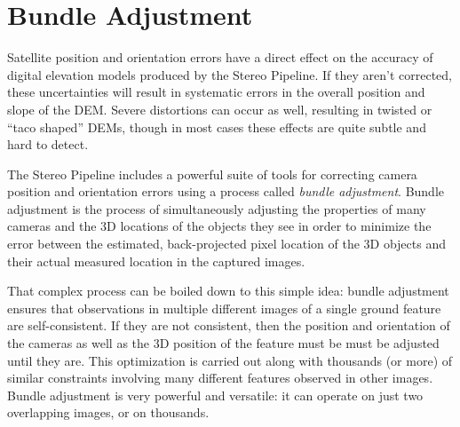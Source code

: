 \chapter{Bundle Adjustment}
\label{ch:bundle_adjustment}

Satellite position and orientation errors have a direct effect on the
accuracy of digital elevation models produced by the Stereo Pipeline.
If they aren't corrected, these uncertainties will result in
systematic errors in the overall position and slope of the DEM.  Severe
distortions can occur as well, resulting in twisted or ``taco shaped''
DEMs, though in most cases these effects are quite subtle and hard to
detect.

The Stereo Pipeline includes a powerful suite of tools for correcting
camera position and orientation errors using a process called
\emph{bundle adjustment}.  Bundle adjustment is the process of
simultaneously adjusting the properties of many cameras and the 3D
locations of the objects they see in order to minimize the error
between the estimated, back-projected pixel location of the 3D
objects and their actual measured location in the captured images.

That complex process can be boiled down to this simple idea: bundle
adjustment ensures that observations in multiple different images
of a single ground feature are self-consistent.  If they are not
consistent, then the position and orientation of the cameras as
well as the 3D position of the feature must be must be adjusted
until they are.  This optimization is carried out along with thousands
(or more) of similar constraints involving many different features
observed in other images.  Bundle adjustment is very powerful and
versatile: it can operate on just two overlapping images, or on
thousands.

